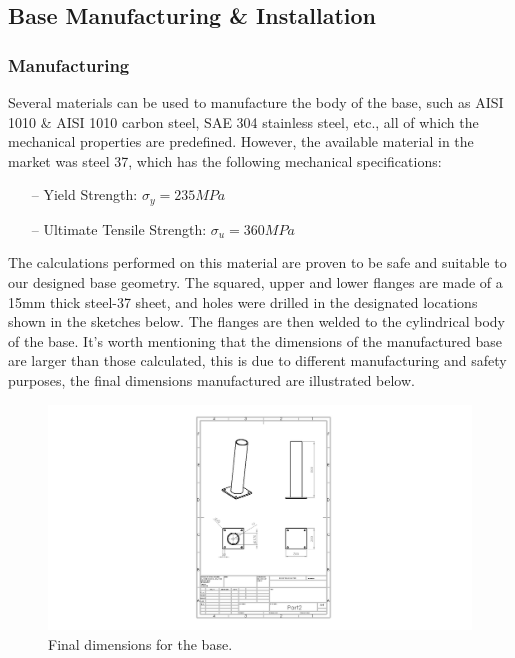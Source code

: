 \newpage

\subsection{Base Manufacturing \& Installation }

\subsubsection{Manufacturing}

Several materials can be used to manufacture the body of the base, such as AISI 1010 \& AISI 1010 carbon steel, SAE 304 stainless steel, etc., all of which the mechanical properties are predefined. However, the available material in the market was steel 37, which has the following mechanical specifications:

\begin{itemize}
	\item[--] Yield Strength: $\sigma_{y} = 235 MPa$
	\item[--] Ultimate Tensile Strength: $\sigma_{u} = 360 MPa$
\end{itemize}


The calculations performed on this material are proven to be safe and suitable to our designed base geometry. 
\newline The squared, upper and lower flanges are made of a 15mm thick steel-37 sheet, and holes were drilled in the designated locations shown in the sketches below. The flanges are then welded to the cylindrical body of the base. It’s worth mentioning that the dimensions of the manufactured base are larger than those calculated, this is due to different manufacturing and safety purposes, the final dimensions manufactured are illustrated below.
\begin{figure}[H]
\begin{center}
	\includegraphics[scale=1]{BaseDim}
	\caption{Final dimensions for the base.}
\end{center}
\end{figure}

